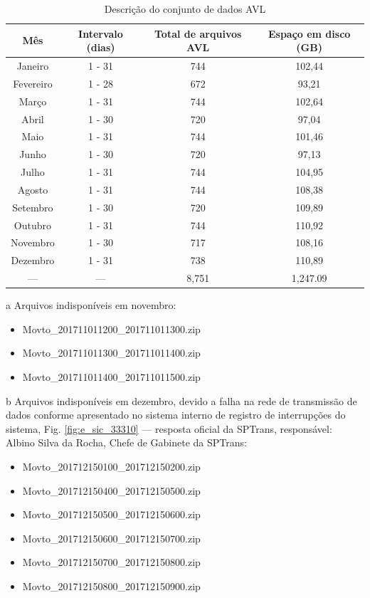 \documentclass[
	12pt,				%
	oneside,			%
	a4paper,			%
	english,			%
	brazil				%
	]{abntex2ppgsi}
\begin{document}
\begin{table}[!htb]
\begin{threeparttable}
\centering
\caption{Descrição do conjunto de dados AVL}
\label{tab:avlDataset}
\begin{tabular}{ c | c | c | c }
\hline
\textbf{Mês} & \textbf{Intervalo (dias)} & \textbf{Total de arquivos AVL} & \textbf{Espaço em disco (GB)} \\
\hline
Janeiro & 1 - 31 & 744 & 102,44 \\
\hline
 Fevereiro & 1 - 28 & 672 & 93,21 \\
\hline
 Março & 1 - 31 & 744 & 102,64 \\
\hline
 Abril & 1 - 30 & 720 & 97,04 \\
\hline
 Maio & 1 - 31 & 744 & 101,46 \\
\hline
 Junho & 1 - 30 & 720 & 97,13 \\
\hline
 Julho & 1 - 31 & 744 & 104,95 \\
\hline
 Agosto & 1 - 31 & 744 & 108,38 \\
\hline
 Setembro & 1 - 30 & 720 & 109,89 \\
\hline
 Outubro & 1 - 31 & 744 & 110,92 \\
\hline
 Novembro\tnote{a} & 1 - 30 & 717 & 108,16 \\
\hline
 Dezembro\tnote{b} & 1 - 31 & 738 & 110,89 \\
\hline
\hline
--- & --- & 8,751 & 1,247.09 \\
\hline
\hline
\end{tabular}
\begin{tablenotes}
\item[a]Arquivos indisponíveis em novembro: 
\begin{itemize}
\item Movto\_201711011200\_201711011300.zip 
\item Movto\_201711011300\_201711011400.zip 
\item Movto\_201711011400\_201711011500.zip
\end{itemize}
\item[b]Arquivos indisponíveis em dezembro, devido a falha na rede de transmissão de dados conforme apresentado no sistema interno de registro de interrupções do sistema, Fig. \ref{fig:e_sic_33310} --- resposta oficial da SPTrans, responsável: Albino Silva da Rocha, Chefe de Gabinete da SPTrans: 
\begin{itemize}
\item Movto\_201712150100\_201712150200.zip 
\item Movto\_201712150400\_201712150500.zip 
\item Movto\_201712150500\_201712150600.zip 
\item Movto\_201712150600\_201712150700.zip 
\item Movto\_201712150700\_201712150800.zip 
\item Movto\_201712150800\_201712150900.zip
\end{itemize}
\end{tablenotes}
\end{threeparttable}
\end{table}
\end{document}

